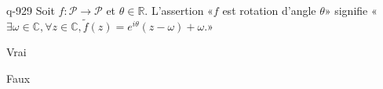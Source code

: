 \begin{truefalse}{q-929}
Soit $f:\mathcal P\to \mathcal P$ et $\theta\in\mathbb R$. L'assertion «$f$ est rotation d'angle $\theta$» signifie «$\exists \omega\in\mathbb C, \forall z\in\mathbb C, \tilde f(z)=e^{i\theta}(z-\omega)+\omega$.»
\item* Vrai
\item Faux
\end{truefalse}

